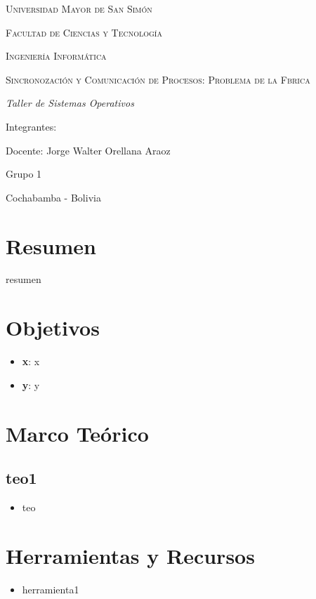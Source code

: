 \documentclass[letterpaper,12pt]{report}
\begin{document}
    \begin{titlepage}
        \centering
        {\scshape\Large Universidad Mayor de San Simón \par}
        \vspace{0.5cm}
        {\scshape\Large Facultad de Ciencias y Tecnología \par}
        \vspace{0.5cm}
        {\scshape\Large Ingeniería Informática \par}
        \vspace{3cm}
        {\scshape\huge Sincronozación y Comunicación de Procesos: Problema de la Fbrica \par}
        \vspace{3cm}
        {\itshape\Large Taller de Sistemas Operativos \par}
        \vfill
        {\Large Integrantes: \par}
        {\Large Docente: Jorge Walter Orellana Araoz \par}
        {\Large Grupo 1 \par}
        \vfill
        {\Large Cochabamba - Bolivia \par}
    \end{titlepage}
\section*{Resumen}
        resumen 
    \section*{Objetivos}
        \begin{itemize}
            \item   \textbf{x}: x
	        \item   \textbf{y}: y
        \end{itemize}
    \newpage
    \section*{Marco Teórico}
    \subsection*{teo1}
        \begin{itemize}
            \item   teo
        \end{itemize}

    \section*{Herramientas y Recursos}
        \begin{itemize}
            \item   herramienta1
        \end{itemize}
\end{document}
